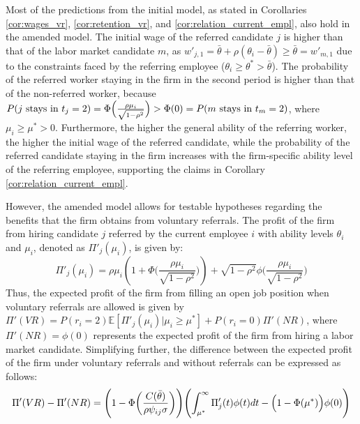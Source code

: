 \documentclass[12pt]{article}
\begin{document}
Most of the predictions from the initial model, as stated in Corollaries \ref{cor:wages_vr}, \ref{cor:retention_vr}, and \ref{cor:relation_current_empl}, also hold in the amended model. The initial wage of the referred candidate $j$ is higher than that of the labor market candidate $m$, as $w'_{j,1} = \bar{\theta} + \rho(\theta_i - \bar{\theta}) \geq \bar{\theta} = w'_{m,1}$ due to the constraints faced by the referring employee ($\theta_i \geq \theta^* > \bar{\theta}$). The probability of the referred worker staying in the firm in the second period is higher than that of the non-referred worker, because $P(j\text{ stays in }t_j=2) = \Phi\Bigl( \frac{\rho \mu_i}{\sqrt{1-\rho^2}} \Bigr) > \Phi(0) = P(m\text{ stays in }t_m=2)$, where $\mu_i \geq \mu^* > 0$. Furthermore, the higher the general ability of the referring worker, the higher the initial wage of the referred candidate, while the probability of the referred candidate staying in the firm increases with the firm-specific ability level of the referring employee, supporting the claims in Corollary \ref{cor:relation_current_empl}.

However, the amended model allows for testable hypotheses regarding the benefits that the firm obtains from voluntary referrals. The profit of the firm from hiring candidate $j$ referred by the current employee $i$ with ability levels $\theta_i$ and $\mu_i$, denoted as $\Pi'_j(\mu_i)$, is given by:
\begin{equation}
    \Pi'_j(\mu_i) = 
    \rho\mu_i
    \left(
    1 + \Phi\biggl( \frac{\rho\mu_i}{\sqrt{1-\rho^2}} \biggr) 
    \right) 
    + 
    \sqrt{1-\rho^2}\phi \biggl( \frac{\rho\mu_i}{\sqrt{1-\rho^2}} \biggr)
\end{equation}
Thus, the expected profit of the firm from filling an open job position when voluntary referrals are allowed is given by $\Pi'(VR) = P(r_i = 2)\mathbb{E}[\Pi'_j(\mu_i)|\mu_i \geq \mu^*] + P(r_i = 0)\Pi'(NR)$, where $\Pi'(NR) = \phi(0)$ represents the expected profit of the firm from hiring a labor market candidate. Simplifying further, the difference between the expected profit of the firm under voluntary referrals and without referrals can be expressed as follows:
\begin{equation}\label{eq:profit_vr_amended}
    \Pi'(VR) - \Pi'(NR) = 
    \Biggl( 
    1 - \Phi\biggl( \frac{C(\bar{\theta})}{\rho \psi_{ij} \sigma} \biggr)
    \Biggr)
    \Biggl( 
    \int^\infty_{\mu^*}\Pi'_j(t)\phi(t)dt 
    -
    \Bigl( 1 - \Phi (\mu^*)\Bigr) \phi(0)
    \Biggr)
\end{equation}
\end{document}
